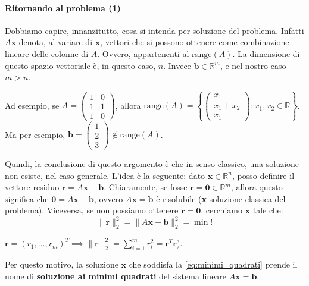 \paragraph{Ritornando al problema (1)}
Dobbiamo capire, innanzitutto, cosa si intenda per soluzione del problema. Infatti $A\mathbf{x}$ denota, al variare di $\mathbf{x}$, vettori che si possono ottenere come combinazione lineare delle colonne di $A$. Ovvero, appartenenti al $\text{range}(A)$.
La dimensione di questo spazio vettoriale è, in questo caso, $n$.
Invece $\mathbf{b} \in \mathbb{R}^m$, e nel nostro caso $m > n$.

Ad esempio, se $A = \begin{pmatrix} 1 & 0 \\ 1 & 1 \\ 1 & 0 \end{pmatrix}$, allora $\text{range}(A) = \left\{ \begin{pmatrix} x_1 \\ x_1+x_2 \\ x_1 \end{pmatrix} : x_1, x_2 \in \mathbb{R} \right\}$.
Ma per esempio, $\mathbf{b} = \begin{pmatrix} 1 \\ 2 \\ 3 \end{pmatrix} \notin \text{range}(A)$.

Quindi, la conclusione di questo argomento è che in senso classico, una soluzione non esiste, nel caso generale.
L'idea è la seguente: dato $\mathbf{x} \in \mathbb{R}^n$, posso definire il \underline{vettore residuo} $\mathbf{r} = A\mathbf{x} - \mathbf{b}$.
Chiaramente, se fosse $\mathbf{r} = \mathbf{0} \in \mathbb{R}^m$, allora questo significa che $\mathbf{0} = A\mathbf{x} - \mathbf{b}$, ovvero $A\mathbf{x} = \mathbf{b}$ è risolubile (\textbf{x} soluzione classica del problema).
Viceversa, se non possiamo ottenere $\mathbf{r} = \mathbf{0}$, cerchiamo $\mathbf{x}$ tale che:
\begin{equation} \label{eq:minimi_quadrati}
    \| \mathbf{r} \|_2^2 = \| A\mathbf{x} - \mathbf{b} \|_2^2 = \min!
\end{equation}
\begin{osservazione}
    $\mathbf{r} = (r_1, \dots, r_m)^T \implies \| \mathbf{r} \|_2^2 = \sum_{i=1}^m r_i^2 = \mathbf{r}^T \mathbf{r}$).
\end{osservazione}
Per questo motivo, la soluzione $\mathbf{x}$ che soddisfa la \eqref{eq:minimi_quadrati} prende il nome di \textbf{soluzione ai minimi quadrati} del sistema lineare $A\mathbf{x} = \mathbf{b}$.

